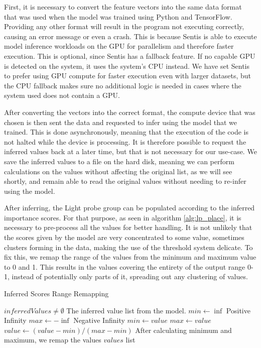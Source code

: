 First, it is necessary to convert the feature vectors into the same data format that was used when the model was trained using Python and TensorFlow. Providing any other format will result in the program not executing correctly, causing an error message or even a crash. This is because Sentis is able to execute model inference workloads on the GPU for parallelism and therefore faster execution. This is optional, since Sentis has a fallback feature. If no capable GPU is detected on the system, it uses the system's CPU instead. We have set Sentis to prefer using GPU compute for faster execution even with larger datasets, but the CPU fallback makes sure no additional logic is needed in cases where the system used does not contain a GPU. 

After converting the vectors into the correct format, the compute device that was chosen is then sent the data and requested to infer using the model that we trained. This is done asynchronously, meaning that the execution of the code is not halted while the device is processing. It is therefore possible to request the inferred values back at a later time, but that is not necessary for our use-case. We save the inferred values to a file on the hard disk, meaning we can perform calculations on the values without affecting the original list, as we will see shortly, and remain able to read the original values without needing to re-infer using the model.\newline

After inferring, the Light probe group can be populated according to the inferred importance scores. For that purpose, as seen in algorithm \ref{alg:lp_place}, it is necessary to pre-process all the values for better handling. It is not unlikely that the scores given by the model are very concentrated to some value, sometimes clusters forming in the data, making the use of the threshold system delicate. To fix this, we remap the range of the values from the minimum and maximum value to 0 and 1. This results in the values covering the entirety of the output range 0-1, instead of potentially only parts of it, spreading out any clustering of values.

\begin{algorithm}
	\caption{Inferred Scores Range Remapping}
	\label{alg:lp_place}
	\begin{algorithmic}[1]
		\Require $inferredValues \neq \emptyset$
		\Comment The inferred value list from the model.
		\State $min \gets \inf$
		\Comment Positive Infinity
		\State $max \gets -\inf$
		\Comment Negative Infinity
				\State $min \gets value$
				\State $max \gets value$
			\EndIf
		\EndFor
			\State $value \gets (value - min) / (max - min)$
			\Comment After calculating minimum and maximum, we remap the values
			\label{alg:lp_place:11}
		\EndFor
		\State \Return $values$ list
	\end{algorithmic}
\end{algorithm}

